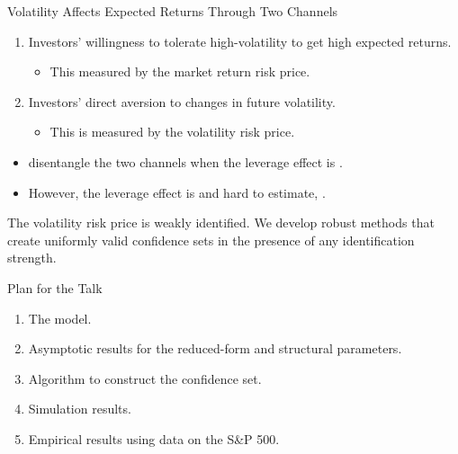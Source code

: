 \documentclass[smaller, aspectratio=169]{beamer}
\let\emph\relax
\begin{document}
\begin{frame}[c]{Volatility Affects Expected Returns Through Two Channels}

    \begin{enumerate}
        \item Investors' willingness to tolerate high-volatility to get high expected returns.
            \begin{itemize}
                \item This measured by the market return risk price.
            \end{itemize}
%
                \item Investors' direct aversion to changes in future volatility.
            \begin{itemize}
                \item This is measured by the volatility risk price.
            \end{itemize}
    \end{enumerate}
            \pause

%
    \begin{itemize}
        \item \Textcite{han2018leverage} disentangle the two channels when the leverage effect is \emph{large}. 
            \pause
        \item However, the leverage effect is \emph{small} and hard to estimate, \parencites{aitsahalia2013leverage, bandi2012timevarying}.
    \end{itemize}

    \pause
    \bigskip

    \begin{block}{}
        The volatility risk price is weakly identified. We develop robust methods that create uniformly valid confidence sets in the presence of any identification strength.
    \end{block}
    
\end{frame}


\begin{frame}[c]{Plan for the Talk}
    \begin{enumerate}
%
        \item The model.
            \bigskip
%
        \item Asymptotic results for the reduced-form and structural parameters.
            \bigskip
%
        \item Algorithm to construct the confidence set.
            \bigskip
%
        \item Simulation results.  
            \bigskip
%
        \item Empirical results using data on the S\&P 500.
%
    \end{enumerate}
\end{frame}
\end{document}

